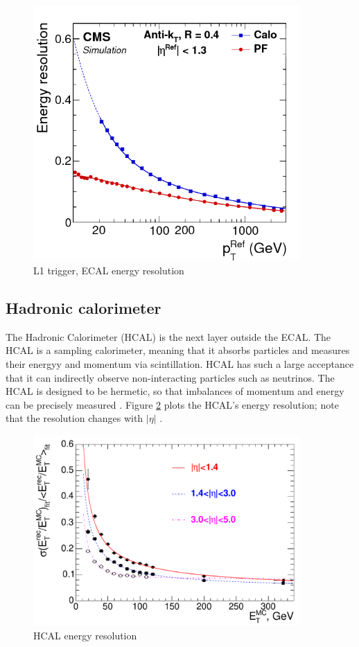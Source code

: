 \begin{figure}[]
\begin{centering}
\includegraphics[width=4in]{Chapter3/importfigs/Figure_013-a.png}
\par\end{centering}
\caption{L1 trigger, ECAL energy resolution \cite{Bayatian:2006nff}\label{fig:ecalResL1}}
\end{figure}
 
 
\subsection{Hadronic calorimeter}

The Hadronic Calorimeter (HCAL) is the next layer outside the ECAL. The HCAL is a sampling calorimeter, meaning that it absorbs particles and measures their energyy and momentum via scintillation. HCAL has such a large acceptance that it can indirectly observe non-interacting particles such as neutrinos. The HCAL is designed to be hermetic, so that imbalances of momentum and energy can be precisely measured \cite{Baiatian:2007xva}. Figure \ref{fig:hcalRes} plots the HCAL's energy resolution; note that the resolution changes with $|\eta|$ \cite{Bayatian:2006nff}.

\begin{figure}[]
\begin{centering}
\includegraphics[width=4in]{Chapter3/importfigs/Figure_001-008.pdf}
\par\end{centering}
\caption{HCAL energy resolution \cite{Bayatian:2006nff}\label{fig:hcalRes}}
\end{figure}


